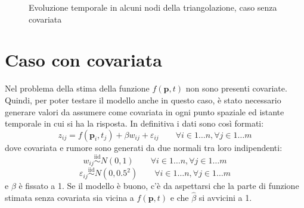 \documentclass[a4paper,11pt,twoside,openright]{book}							%
\begin{document}
\begin{figure}[t]
	\centering
	\caption{Evoluzione temporale in alcuni nodi della triangolazione, caso senza covariata}
	\label{fig:DomC_ris2}
\end{figure}
\newpage
\section{Caso con covariata}

Nel problema della stima della funzione $f(\bm p,t)$ non sono presenti covariate. Quindi, per poter testare il modello anche in questo caso, è stato necessario generare valori da assumere come covariata in ogni punto spaziale ed istante temporale in cui si ha la risposta.
In definitiva i dati sono così formati:
$$
z_{ij}=f(\bm p_{i},t_j) + \beta w_{ij} + \varepsilon_{ij} \qquad \forall i \in 1\ldots n, \forall j \in 1\ldots m
$$
dove covariata e rumore sono generati da due normali tra loro indipendenti:
$$
w_{ij}\stackrel{\mathrm{iid}}{\sim}N(0,1) \qquad \forall i \in 1\ldots n, \forall j \in 1\ldots m
$$
$$
\varepsilon_{ij}\stackrel{\mathrm{iid}}{\sim}N(0,0.5^2) \qquad \forall i \in 1\ldots n, \forall j \in 1\ldots m
$$
e $\beta$ è fissato a 1. Se il modello è buono, c'è da aspettarsi che la parte di funzione stimata senza covariata sia vicina a $f(\bm p,t)$ e che $\hat{\beta}$ si avvicini a 1.
 
\end{document}
